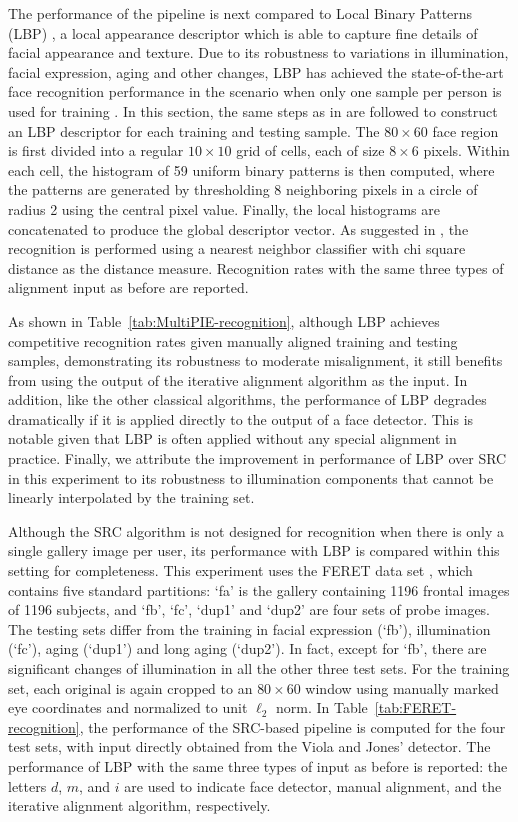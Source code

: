 The performance of the pipeline is next compared to Local Binary Patterns (LBP)
\cite{Ahonen2006-PAMI}, a local appearance descriptor which is able to capture
fine details of facial appearance and texture.  Due to its robustness to
variations in illumination, facial expression, aging and other changes, LBP has
achieved the state-of-the-art face recognition performance in the scenario when
only one sample per person is used for training \cite{Tan06facerecognition}. In
this section, the same steps as in \cite{Ahonen2006-PAMI} are followed to
construct an LBP descriptor for each training and testing sample. The $80\times
60$ face region is first divided into a regular $10\times 10$ grid of cells,
each of size $8\times 6$ pixels. Within each cell, the histogram of 59 uniform
binary patterns is then computed, where the patterns are generated by
thresholding 8 neighboring pixels in a circle of radius 2 using the central
pixel value. Finally, the local histograms are concatenated to produce the
global descriptor vector. As suggested in \cite{Ahonen2006-PAMI}, the
recognition is performed using a nearest neighbor classifier with chi square
distance as the distance measure. Recognition rates with the
same three types of alignment input as before are reported.

As shown in Table~\ref{tab:MultiPIE-recognition}, although LBP
achieves competitive recognition rates given manually aligned
training and testing samples, demonstrating its robustness to
moderate misalignment, it still benefits from using the output
of the iterative alignment algorithm as the input. In addition,
like the other classical algorithms, the performance of LBP
degrades dramatically if it is applied directly to the output
of a face detector. This is notable given that LBP is often
applied without any special alignment in practice. Finally, we
attribute the improvement in performance of LBP over SRC in
this experiment to its robustness to illumination components
that cannot be linearly interpolated by the training set.

Although the SRC algorithm is not designed for recognition when there is only a
single gallery image per user, its performance with LBP is compared within this
setting for completeness. This experiment uses the FERET data set
\cite{phillips1998feret}, which contains five standard partitions: `fa' is the
gallery containing 1196 frontal images of 1196 subjects, and `fb', `fc', `dup1'
and `dup2' are four sets of probe images. The testing sets differ from the
training in facial expression (`fb'), illumination (`fc'), aging (`dup1') and
long aging (`dup2'). In fact, except for `fb', there are significant changes of
illumination in all the other three test sets.  For the training set, each
original is again cropped to an $80\times 60$ window using manually marked eye
coordinates \cite{Deng2010-PR} and normalized to unit $\ell_2$ norm.  In
Table~\ref{tab:FERET-recognition}, the performance of the SRC-based pipeline is
computed for the four test sets, with input directly obtained from the Viola
and Jones' detector.  The performance of LBP with the same three types of input
as before is reported: the letters $d$, $m$, and $i$ are used to
indicate face detector, manual alignment, and the iterative alignment
algorithm, respectively.

